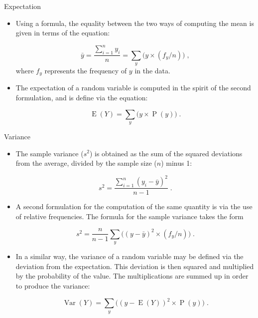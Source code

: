 \documentclass[10pt,handout]{beamer}\usepackage[]{graphicx}\usepackage[]{color}
\newcommand{\Var}{\operatorname{Var}}
\newcommand{\Expec}{\operatorname{E}}
\newcommand{\Prob}{\operatorname{P}}
\begin{document}
\begin{frame}[fragile]{Expectation}
	\small
	\begin{itemize}		
	
		\item Using a formula, the equality between the two ways of computing the mean is
		given in terms of the equation:
		
		$$\bar y = \frac{\sum_{i=1}^n y_i}{n} = \sum_y \big(y \times (f_y/n)\big)\;,$$
		where $f_y$ represents the frequency of $y$ in the data. 
		
		\item The expectation of a random variable is computed in the spirit of the
		second formulation, and is define via the equation:
		
		$$\Expec(Y) = \sum_y \big(y \times \Prob(y)\big)\;.$$
		
		
	\end{itemize}
	
\end{frame}



\begin{frame}[fragile]{Variance}
	\small
	\begin{itemize}		
		
		\item The sample variance ($s^2$) is obtained as the sum of the squared
		deviations from the average, divided by the sample size ($n$) minus 1:
		
		$$s^2 = \frac{\sum_{i=1}^n (y_i - \bar y)^2}{n-1}\;.$$ 
		
		\item  A second	formulation for the computation of the same quantity is via the use of
		relative frequencies. The formula for the sample variance takes the form
		
		$$s^2 = \frac{n}{n-1}\sum_y \big((y - \bar y)^2\times (f_y/n)\big)\;.$$
		
		
		\item In a similar way, the variance of a random variable may be defined via
		the deviation from the expectation. This deviation is
		then squared and multiplied by the probability of the value. The
		multiplications are summed up in order to produce the variance:
		
		$$\Var(Y) = \sum_y\big( (y-\Expec(Y))^2 \times \Prob(y)\big)\;.$$
		
	\end{itemize}
	
\end{frame}
\end{document}
